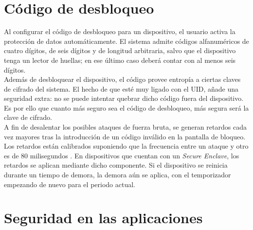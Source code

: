 \section{Código de desbloqueo}
Al configurar el código de desbloqueo para un dispositivo, el usuario activa la protección de datos automáticamente. El sistema admite códigos alfanuméricos de cuatro dígitos, de seis dígitos y de longitud arbitraria, salvo que el dispositivo tenga un lector de huellas; en ese último caso deberá contar con al menos seis dígitos.\\
Además de desbloquear el dispositivo, el código provee entropía a ciertas claves de cifrado del sistema. El hecho de que esté muy ligado con el UID, añade una seguridad extra: no se puede intentar quebrar dicho código fuera del dispositivo. Es por ello que cuanto más seguro sea el código de desbloqueo, más segura será la clave de cifrado.\\
A fin de desalentar los posibles ataques de fuerza bruta, se generan retardos cada vez mayores tras la introducción de un código inválido en la pantalla de bloqueo. Los retardos están calibrados suponiendo que la frecuencia entre un ataque y otro es de 80 milisegundos \cite{asg}. En dispositivos que cuentan con un \textit{Secure Enclave}, los retardos se aplican mediante dicho componente. Si el dispositivo se reinicia durante un tiempo de demora, la demora aún se aplica, con el temporizador empezando de nuevo para el periodo actual.
\section{Seguridad en las aplicaciones}
